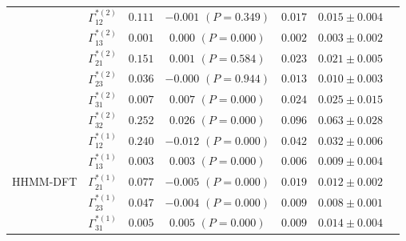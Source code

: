 \documentclass{article}
\begin{document}
\begin{center}
{\begin{tabular}{ccccccc}
                             & $\Gamma^{*(2)}_{12}$          & $0.111$                         & $-0.001$ $(P=0.349)$        & $0.017$                           & $0.015 \pm 0.004$                             \\
                             & $\Gamma^{*(2)}_{13}$          & $0.001$                         & $0.000$ $(P=0.000)$        & $0.002$                           & $0.003 \pm 0.002$                             \\
                             & $\Gamma^{*(2)}_{21}$          & $0.151$                         & $0.001$ $(P=0.584)$        & $0.023$                           & $0.021 \pm 0.005$                             \\
                             & $\Gamma^{*(2)}_{23}$          & $0.036$                         & $-0.000$ $(P=0.944)$        & $0.013$                           & $0.010 \pm 0.003$                             \\
                             & $\Gamma^{*(2)}_{31}$          & $0.007$                         & $0.007$ $(P=0.000)$        & $0.024$                           & $0.025 \pm 0.015$                             \\
                             & $\Gamma^{*(2)}_{32}$          & $0.252$                         & $0.026$ $(P=0.000)$        & $0.096$                           & $0.063 \pm 0.028$                             \\ \hline
\multirow{12}{*}{HHMM-DFT}   & $\Gamma^{*(1)}_{12}$          & $0.240$                         & $-0.012$ $(P=0.000)$        & $0.042$                           & $0.032 \pm 0.006$                             \\
                             & $\Gamma^{*(1)}_{13}$          & $0.003$                         & $0.003$ $(P=0.000)$        & $0.006$                           & $0.009 \pm 0.004$                             \\
                             & $\Gamma^{*(1)}_{21}$          & $0.077$                         & $-0.005$ $(P=0.000)$        & $0.019$                           & $0.012 \pm 0.002$                             \\
                             & $\Gamma^{*(1)}_{23}$          & $0.047$                         & $-0.004$ $(P=0.000)$        & $0.009$                           & $0.008 \pm 0.001$                             \\
                             & $\Gamma^{*(1)}_{31}$          & $0.005$                         & $0.005$ $(P=0.000)$        & $0.009$                           & $0.014 \pm 0.004$                             \\

\end{tabular}}
\end{center}
\end{document}
